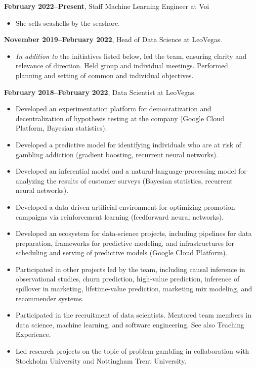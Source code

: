 \documentclass[journal]{IEEEtran}
\begin{document}
{\bf February 2022--Present}, Staff Machine Learning Engineer at Voi
\begin{itemize}
\item She sells seashells by the seashore.
\end{itemize}

{\bf November 2019--February 2022}, Head of Data Science at LeoVegas.
\begin{itemize}
\item \emph{In addition to} the initiatives listed below, led the team, ensuring
clarity and relevance of direction. Held group and individual meetings.
Performed planning and setting of common and individual objectives.
\end{itemize}

{\bf February 2018--February 2022}, Data Scientist at LeoVegas.
\begin{itemize}
\item Developed an experimentation platform for democratization and
decentralization of hypothesis testing at the company (Google Cloud Platform,
Bayesian statistics).

\item Developed a predictive model for identifying individuals who are at risk
of gambling addiction (gradient boosting, recurrent neural networks).

\item Developed an inferential model and a natural-language-processing model for
analyzing the results of customer surveys (Bayesian statistics, recurrent neural
networks).

\item Developed a data-driven artificial environment for optimizing promotion
campaigns via reinforcement learning (feedforward neural networks).

\item Developed an ecosystem for data-science projects, including pipelines for
data preparation, frameworks for predictive modeling, and infrastructures for
scheduling and serving of predictive models (Google Cloud Platform).

\item Participated in other projects led by the team, including causal inference
in observational studies, churn prediction, high-value prediction, inference of
spillover in marketing, lifetime-value prediction, marketing mix modeling, and
recommender systems.

\item Participated in the recruitment of data scientists. Mentored team members
in data science, machine learning, and software engineering. See also Teaching
Experience.

\item Led research projects on the topic of problem gambling in collaboration
with Stockholm University and Nottingham Trent University.
\end{itemize}
\end{document}
